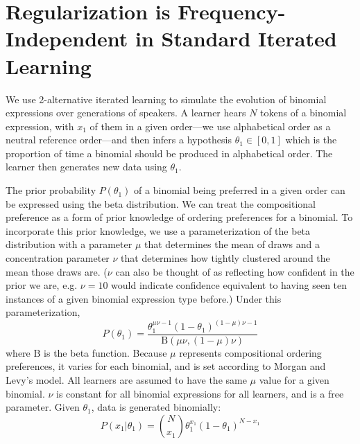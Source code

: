 \documentclass{evolang11}
\begin{document}
\section{Regularization is Frequency-Independent in Standard Iterated Learning}
\label{sec:regul-freq-indep}
%
We use 2-alternative iterated learning \cite{Reali:2009dp,SMITH:2009uw} to simulate the evolution of binomial expressions over generations of speakers.
 A learner hears $N$ tokens of a binomial expression, with $x_1$ of them in a given order---we use alphabetical order as a neutral reference order---and then infers a hypothesis $\theta_1 \in [0,1]$ which is the proportion of time a binomial should be produced in alphabetical order. The learner then generates new data using $\theta_1$.
 
The prior probability $P(\theta_1)$ of a binomial being preferred in a given order can be expressed using the beta distribution. We can treat the compositional preference as a form of prior knowledge of ordering preferences for a binomial. To incorporate this prior knowledge, we use a parameterization of the beta distribution with a parameter $\mu$ that determines the mean of draws and a concentration parameter $\nu$ that determines how tightly clustered around the mean those draws are. ($\nu$ can also be thought of as reflecting how confident in the prior we are, e.g. $\nu=10$ would indicate confidence equivalent to having seen ten instances of a given binomial expression type before.) Under this parameterization,
\begin{equation}
P(\theta_1) = \frac{\theta_1^{\mu\nu-1}(1-\theta_1)^{(1-\mu)\nu-1}}{\mathrm{B}(\mu\nu,(1-\mu)\nu)}
\end{equation}
where $\mathrm{B}$ is the beta function. Because $\mu$ represents compositional ordering preferences, it varies for each binomial, and is set according to Morgan and Levy's model. All learners are assumed to have the same $\mu$ value for a given binomial. $\nu$ is constant for all binomial expressions for all learners, and is a free parameter. Given $\theta_1$, data is generated binomially:
\begin{equation}
P(x_1|\theta_1) = \binom{N}{x_1}\theta_1^{x_1}(1-\theta_1)^{N-x_1}\label{eq:binomial}
\end{equation}
\end{document}
